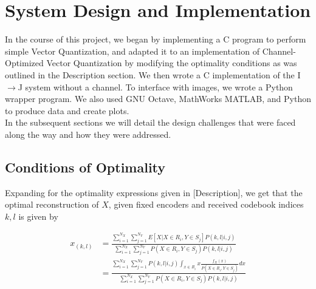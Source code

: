 \documentclass[10pt]{article}
\begin{document}
\section{System Design and Implementation}

In the course of this project, we began by implementing a C program to perform simple Vector Quantization, and adapted it to an implementation of Channel-Optimized Vector Quantization by modifying the optimality conditions as was outlined in the Description section. We then wrote a C implementation of the I$\rightarrow$J system without a channel. To interface with images, we wrote a Python wrapper program. We also used GNU Octave, MathWorks MATLAB, and Python to produce data and create plots.\\

In the subsequent sections we will detail the design challenges that were faced along the way and how they were addressed.

\subsection{Conditions of Optimality}

Expanding for the optimality expressions given in [Description], we get that the optimal reconstruction of $X$, given fixed encoders and received codebook indices $k,l$ is given by

\begin{align}
    x_{(k,l)}&=
    \frac{
        \sum_{i=1}^{N_X}\sum_{j=1}^{N_Y}
            E[X|X\in R_i, Y\in S_j]P(k,l|i,j)
    }{
        \sum_{i=1}^{N_X}\sum_{j=1}^{N_Y}
            P(X\in R_i, Y\in S_j)P(k,l|i,j)
    }\\
    &=
    \frac{
        \sum_{i=1}^{N_X}\sum_{j=1}^{N_Y}
            P(k,l|i,j)\int_{x\in R_i}x
                \frac{
                    f_X(x)
                }{
                    P(X\in R_i, Y\in S_j)
                }dx
    }{
        \sum_{i=1}^{N_X}\sum_{j=1}^{N_Y}
            P(X\in R_i, Y\in S_j)P(k,l|i,j)
    }
\end{align}
\end{document}
